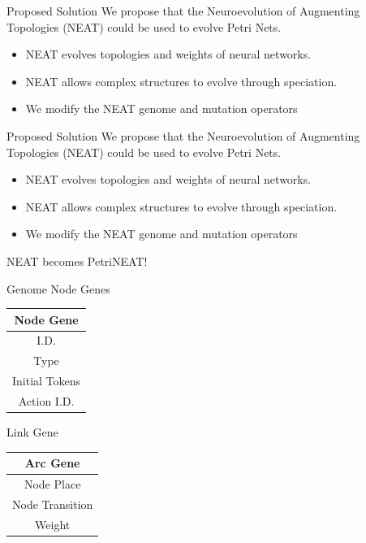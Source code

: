 \documentclass[12pt]{beamer}
\begin{document}
\begin{frame}{Proposed Solution}
We propose that the Neuroevolution of Augmenting Topologies (NEAT) could be used to evolve Petri Nets.
\begin{itemize}
\item NEAT evolves topologies and weights of neural networks.
\item NEAT allows complex structures to evolve through speciation.
\item We modify the NEAT genome and mutation operators
\end{itemize}
\bigskip

\end{frame}
\begin{frame}{Proposed Solution}
We propose that the Neuroevolution of Augmenting Topologies (NEAT) could be used to evolve Petri Nets.
\begin{itemize}
\item NEAT evolves topologies and weights of neural networks.
\item NEAT allows complex structures to evolve through speciation.
\item We modify the NEAT genome and mutation operators
\end{itemize}
\bigskip
NEAT becomes PetriNEAT!
\end{frame}


\begin{frame}{Genome}
Node Genes
\begin{table}
\centering
\begin{tabular}{|c|}
\hline
Node Gene\\ \hline
I.D. \\
Type \\
Initial Tokens \\
Action I.D. \\
\hline
\end{tabular}
\end{table}

Link Gene
\begin{table}
\centering
\begin{tabular}{|c|}
\hline
Arc Gene\\ \hline
Node Place \\
Node Transition \\
Weight \\
\hline
\end{tabular}
\end{table}

\end{frame}
\end{document}

